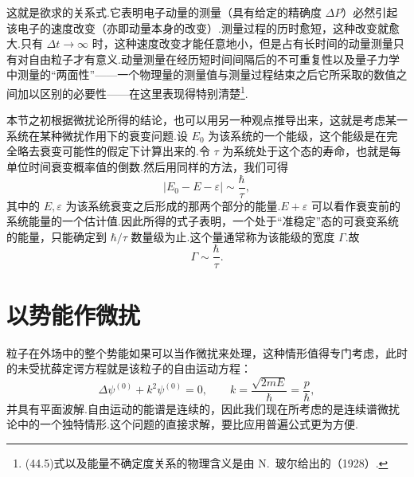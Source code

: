 这就是欲求的关系式.它表明电子动量的测量（具有给定的精确度 $\Delta P$）必然引起该电子的速度改变（亦即动量本身的改变）.测量过程的历时愈短，这种改变就愈大.只有 $\Delta t\to\infty$ 时，这种速度改变才能任意地小，但是占有长时间的动量测量只有对自由粒子才有意义.动量测量在经历短时间间隔后的不可重复性以及量子力学中测量的“两面性”——一个物理量的测量值与测量过程结束之后它所采取的数值之间加以区别的必要性——在这里表现得特别清楚\footnote{(44.5)式以及能量不确定度关系的物理含义是由 N.~玻尔给出的（1928）.}.

本节之初根据微扰论所得的结论，也可以用另一种观点推导出来，这就是考虑某一系统在某种微扰作用下的衰变问题.设 $E_0$ 为该系统的一个能级，这个能级是在完全略去衰变可能性的假定下计算出来的.令 $\tau$ 为系统处于这个态的寿命，也就是每单位时间衰变概率值的倒数.然后用同样的方法，我们可得
\begin{equation}
  \left|E_0-E-\varepsilon\right|\sim\frac{\hbar}{\tau},
\end{equation}
其中的 $E,\varepsilon$ 为该系统衰变之后形成的那两个部分的能量.$E+\varepsilon$ 可以看作衰变前的系统能量的一个估计值.因此所得的式子表明，一个处于“准稳定”态的可衰变系统的能量，只能确定到 $\hbar/\tau$ 数量级为止.这个量通常称为该能级的宽度 $\Gamma$.故
\begin{equation}
  \Gamma\sim\frac{\hbar}{\tau}.
\end{equation}

\section{以势能作微扰}

粒子在外场中的整个势能如果可以当作微扰来处理，这种情形值得专门考虑，此时的未受扰薛定谔方程就是该粒子的自由运动方程：
\begin{equation}
  \Delta\psi^{(0)}+k^2\psi^{(0)}=0,\qquad
  k=\frac{\sqrt{2mE}}{\hbar}=\frac{p}{\hbar},
\end{equation}
并具有平面波解.自由运动的能谱是连续的，因此我们现在所考虑的是连续谱微扰论中的一个独特情形.这个问题的直接求解，要比应用普遍公式更为方便.

